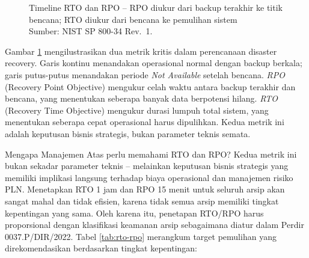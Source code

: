 \documentclass[12pt,a4paper]{report}
\begin{document}
\begin{figure}[H]
{%
}
\caption{Timeline RTO dan RPO -- RPO diukur dari backup terakhir ke titik bencana; RTO diukur dari bencana ke pemulihan sistem\\
\small Sumber: NIST SP 800-34 Rev.~1.}
\label{fig:rto-rpo}
\end{figure}

\small Gambar \ref{fig:rto-rpo} mengilustrasikan dua metrik kritis dalam perencanaan disaster recovery. Garis kontinu menandakan operasional normal dengan backup berkala; garis putus-putus menandakan periode \textit{Not Available} setelah bencana. \textit{RPO} (Recovery Point Objective) mengukur celah waktu antara backup terakhir dan bencana, yang menentukan seberapa banyak data berpotensi hilang. \textit{RTO} (Recovery Time Objective) mengukur durasi lumpuh total sistem, yang menentukan seberapa cepat operasional harus dipulihkan. Kedua metrik ini adalah keputusan bisnis strategis, bukan parameter teknis semata.

Mengapa Manajemen Atas perlu memahami RTO dan RPO? Kedua metrik ini bukan sekadar parameter teknis -- melainkan keputusan bisnis strategis yang memiliki implikasi langsung terhadap biaya operasional dan manajemen risiko PLN. Menetapkan RTO 1 jam dan RPO 15 menit untuk seluruh arsip akan sangat mahal dan tidak efisien, karena tidak semua arsip memiliki tingkat kepentingan yang sama. Oleh karena itu, penetapan RTO/RPO harus proporsional dengan klasifikasi keamanan arsip sebagaimana diatur dalam Perdir 0037.P/DIR/2022. Tabel \ref{tab:rto-rpo} merangkum target pemulihan yang direkomendasikan berdasarkan tingkat kepentingan:
\end{document}
